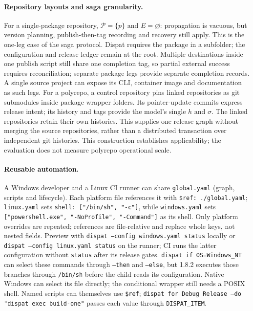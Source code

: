\documentclass[sigconf,nonacm]{acmart}
\newcommand{\code}[1]{\texttt{#1}}
\begin{document}
\paragraph{Repository layouts and saga granularity.}
For a single-package repository, $\mathcal{P}=\{p\}$ and $E=\varnothing$:
propagation is vacuous, but version planning, publish-then-tag recording and
recovery still apply. This is the one-leg case of the saga protocol. Dispat
requires the package in a subfolder; the configuration and release ledger
remain at the root. Multiple destinations inside one publish script still
share one completion tag, so partial external success requires reconciliation;
separate package legs provide separate completion records. A single source
project can expose its CLI, container image and documentation as such legs.
For a polyrepo, a control repository pins linked repositories as git submodules
inside package wrapper folders. Its pointer-update commits express release
intent; its history and tags provide the model's single $h$ and $\sigma$.
The linked repositories retain their own histories. This supplies one release
graph without merging the source repositories, rather than a distributed
transaction over independent git histories. This construction establishes
applicability; the evaluation does not measure polyrepo operational scale.

\paragraph{Reusable automation.}
A Windows developer and a Linux CI runner can share \code{global.yaml}
(graph, scripts and lifecycle). Each platform file references it with
\code{\$ref: ./global.yaml}; \code{linux.yaml} sets
\code{shell: ["/bin/sh", "-c"]}, while \code{windows.yaml} sets
\code{["powershell.exe", "-NoProfile", "-Command"]} as its shell.
Only platform overrides are repeated; references are file-relative and
replace whole keys, not nested fields. Preview with
\code{dispat --config windows.yaml status} locally or
\code{dispat --config linux.yaml status} on the runner; CI runs the latter
configuration without \code{status} after its release gates.
\code{dispat if OS=Windows\_NT} can select these commands through
\code{--then} and \code{--else}, but 1.8.2 executes those branches through
\code{/bin/sh} before the child reads its configuration. Native Windows can
select its file directly; the conditional wrapper still needs a POSIX shell.
Named scripts can themselves use \code{\$ref};
\code{dispat for Debug Release --do "dispat exec build-one"}
passes each value through \code{DISPAT\_ITEM}.
\end{document}
